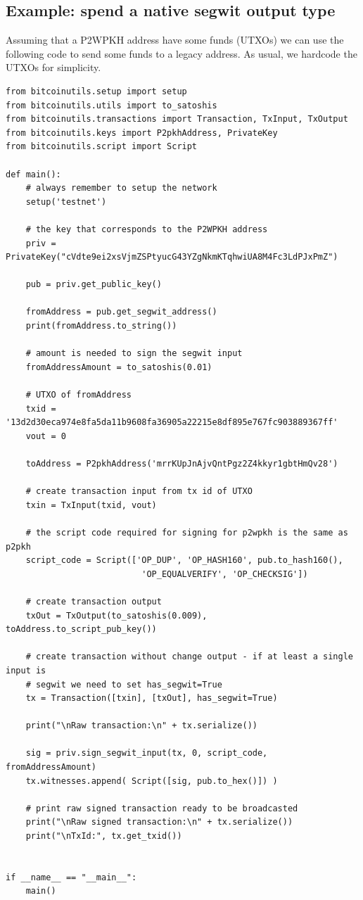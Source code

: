 \subsection*{Example: spend a native segwit output type}
Assuming that a P2WPKH address have some funds (UTXOs) we can use the following code to send some funds to a legacy address. As usual, we hardcode the UTXOs for simplicity.

\vspace{1em}
\begin{lstlisting}[style=Python]
from bitcoinutils.setup import setup
from bitcoinutils.utils import to_satoshis
from bitcoinutils.transactions import Transaction, TxInput, TxOutput
from bitcoinutils.keys import P2pkhAddress, PrivateKey
from bitcoinutils.script import Script

def main():
    # always remember to setup the network
    setup('testnet')

    # the key that corresponds to the P2WPKH address
    priv = PrivateKey("cVdte9ei2xsVjmZSPtyucG43YZgNkmKTqhwiUA8M4Fc3LdPJxPmZ")

    pub = priv.get_public_key()

    fromAddress = pub.get_segwit_address()
    print(fromAddress.to_string())

    # amount is needed to sign the segwit input
    fromAddressAmount = to_satoshis(0.01)

    # UTXO of fromAddress
    txid = '13d2d30eca974e8fa5da11b9608fa36905a22215e8df895e767fc903889367ff'
    vout = 0

    toAddress = P2pkhAddress('mrrKUpJnAjvQntPgz2Z4kkyr1gbtHmQv28')

    # create transaction input from tx id of UTXO
    txin = TxInput(txid, vout)

    # the script code required for signing for p2wpkh is the same as p2pkh
    script_code = Script(['OP_DUP', 'OP_HASH160', pub.to_hash160(),
                           'OP_EQUALVERIFY', 'OP_CHECKSIG'])

    # create transaction output
    txOut = TxOutput(to_satoshis(0.009), toAddress.to_script_pub_key())

    # create transaction without change output - if at least a single input is
    # segwit we need to set has_segwit=True
    tx = Transaction([txin], [txOut], has_segwit=True)

    print("\nRaw transaction:\n" + tx.serialize())

    sig = priv.sign_segwit_input(tx, 0, script_code, fromAddressAmount)
    tx.witnesses.append( Script([sig, pub.to_hex()]) )

    # print raw signed transaction ready to be broadcasted
    print("\nRaw signed transaction:\n" + tx.serialize())
    print("\nTxId:", tx.get_txid())


if __name__ == "__main__":
    main()
\end{lstlisting}
\vspace{1em}


